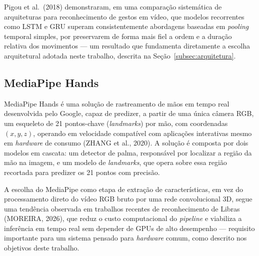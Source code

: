 Pigou et al.\ (2018) demonstraram, em uma comparação sistemática de arquiteturas
para reconhecimento de gestos em vídeo, que modelos recorrentes como LSTM e GRU
superam consistentemente abordagens baseadas em \textit{pooling} temporal
simples, por preservarem de forma mais fiel a ordem e a duração relativa dos
movimentos — um resultado que fundamenta diretamente a escolha arquitetural
adotada neste trabalho, descrita na Seção~\ref{subsec:arquitetura}.

\subsection{MediaPipe Hands}

MediaPipe Hands é uma solução de rastreamento de mãos em tempo real desenvolvida
pelo Google, capaz de predizer, a partir de uma única câmera RGB, um esqueleto de
21 pontos-chave (\textit{landmarks}) por mão, com coordenadas $(x, y, z)$,
operando em velocidade compatível com aplicações interativas mesmo em
\textit{hardware} de consumo (ZHANG et al., 2020). A solução é composta por dois
modelos em cascata: um detector de palma, responsável por localizar a região da
mão na imagem, e um modelo de \textit{landmarks}, que opera sobre essa região
recortada para predizer os 21 pontos com precisão.

A escolha do MediaPipe como etapa de extração de características, em vez do
processamento direto do vídeo RGB bruto por uma rede convolucional 3D, segue uma
tendência observada em trabalhos recentes de reconhecimento de Libras (MOREIRA,
2026), que reduz o custo computacional do \textit{pipeline} e viabiliza a
inferência em tempo real sem depender de GPUs de alto desempenho — requisito
importante para um sistema pensado para \textit{hardware} comum, como descrito
nos objetivos deste trabalho.
